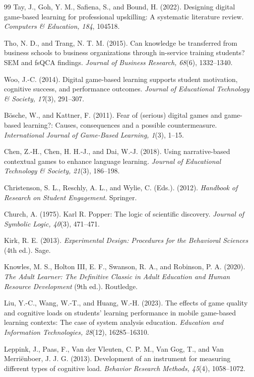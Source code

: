 \documentclass[12pt]{report}
\begin{document}
\begin{thebibliography}{99}
Tay, J., Goh, Y. M., Safiena, S., and Bound, H. (2022).
Designing digital game-based learning for professional upskilling: A systematic literature review.
\textit{Computers \& Education, 184}, 104518.

Tho, N. D., and Trang, N. T. M. (2015).
Can knowledge be transferred from business schools to business organizations through in-service training students? SEM and fsQCA findings.
\textit{Journal of Business Research, 68}(6), 1332--1340.

Woo, J.-C. (2014).
Digital game-based learning supports student motivation, cognitive success, and performance outcomes.
\textit{Journal of Educational Technology \& Society, 17}(3), 291--307.


B\"osche, W., and Kattner, F. (2011).
Fear of (serious) digital games and game-based learning?: Causes, consequences and a possible countermeasure.
\textit{International Journal of Game-Based Learning, 1}(3), 1--15.

Chen, Z.-H., Chen, H. H.-J., and Dai, W.-J. (2018).
Using narrative-based contextual games to enhance language learning.
\textit{Journal of Educational Technology \& Society, 21}(3), 186--198.

Christenson, S. L., Reschly, A. L., and Wylie, C. (Eds.). (2012).
\textit{Handbook of Research on Student Engagement}.
Springer.

Church, A. (1975).
Karl R. Popper: The logic of scientific discovery.
\textit{Journal of Symbolic Logic, 40}(3), 471--471.

Kirk, R. E. (2013).
\textit{Experimental Design: Procedures for the Behavioral Sciences} (4th ed.).
Sage.

Knowles, M. S., Holton III, E. F., Swanson, R. A., and Robinson, P. A. (2020).
\textit{The Adult Learner: The Definitive Classic in Adult Education and Human Resource Development} (9th ed.).
Routledge.

Liu, Y.-C., Wang, W.-T., and Huang, W.-H. (2023).
The effects of game quality and cognitive loads on students' learning performance in mobile game-based learning contexts: The case of system analysis education.
\textit{Education and Information Technologies, 28}(12), 16285--16310.

Leppink, J., Paas, F., Van der Vleuten, C. P. M., Van Gog, T., and Van Merri\"enboer, J. J. G. (2013).
Development of an instrument for measuring different types of cognitive load.
\textit{Behavior Research Methods, 45}(4), 1058--1072.


\end{thebibliography}
\end{document}
